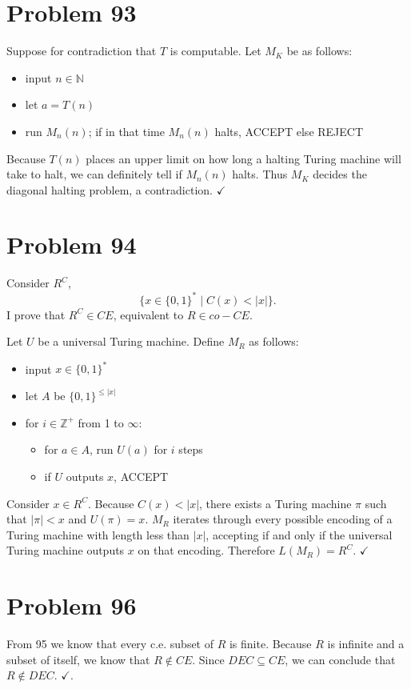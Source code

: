 \documentclass[11pt]{article}
\begin{document}
\section*{Problem 93}

Suppose for contradiction that $T$ is computable.
Let $M_K$ be as follows:
\begin{itemize}
	\item input $n \in \mathbb{N}$
	\item let $a = T(n)$
	\item run $M_n(n)$; if in that time $M_n(n)$ halts, ACCEPT else REJECT
\end{itemize}

Because $T(n)$ places an upper limit on how long a halting Turing machine will take to halt, we can definitely tell if $M_n(n)$ halts.
Thus $M_K$ decides the diagonal halting problem, a contradiction. $\checkmark$


\section*{Problem 94}

Consider $R^C$,
	\[ \{x \in \{0,1\}^* \mid C(x) < |x| \}. \]
I prove that $R^C \in CE$, equivalent to $R \in co-CE$.

Let $U$ be a universal Turing machine.
Define $M_R$ as follows:
\begin{itemize}
	\item input $x \in \{0,1\}^* $
	\item let $A$ be $\{0,1\}^{\leq |x|}$
	\item for $i \in \mathbb{Z}^+$ from 1 to $\infty$:
	\begin{itemize}
		\item for $a \in A$, run $U(a)$ for $i$ steps
		\item if $U$ outputs $x$, ACCEPT
	\end{itemize}
\end{itemize}

Consider $x \in R^C$.
Because $C(x) < |x|$, there exists a Turing machine $\pi$ such that $|\pi| < x$ and $U(\pi) = x$.
$M_R$ iterates through every possible encoding of a Turing machine with length less than $|x|$, accepting if and only if the universal Turing machine outputs $x$ on that encoding.
Therefore $L(M_R) = R^C$. $\checkmark$



\section*{Problem 96}

From 95 we know that every c.e. subset of $R$ is finite.
Because $R$ is infinite and a subset of itself, we know that $R \notin CE$.
Since $DEC \subseteq CE$, we can conclude that $R \notin DEC$. $\checkmark$.
\end{document}
